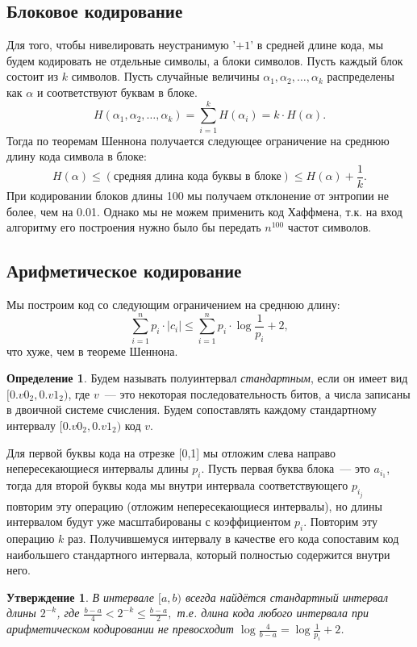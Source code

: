 \documentclass[12pt]{article}
\newcommand{\seqn}[2]{{#1}_1,{#1}_2,\dotsc,{#1}_{#2}}
\theoremstyle{definition}
\newtheorem{definition}{Определение}[section]
\theoremstyle{plain}
\newtheorem{statement}{Утверждение}[section]
\theoremstyle{remark}
\begin{document}
\subsection{Блоковое кодирование}
Для того, чтобы нивелировать неустранимую '$+1$' в средней длине кода, мы будем
кодировать не отдельные символы, а блоки символов.
Пусть каждый блок состоит из $k$ символов. Пусть случайные величины $\seqn{\alpha}{k}$
распределены как $\alpha$ и соответствуют буквам в блоке. 
\[
    H(\seqn{\alpha}{k}) = \sum_{i=1}^k H(\alpha_i) = k\cdot H(\alpha).
\]
Тогда по теоремам Шеннона получается
следующее ограничение на среднюю длину кода символа в блоке:               
\[
    H(\alpha)\le (\text{средняя длина кода буквы в блоке})\le H(\alpha) +
    \frac{1}{k}.
\]
При кодировании блоков длины 100 мы получаем отклонение от энтропии не
более, чем на 0.01. Однако мы не можем применить код Хаффмена, т.к. на
вход алгоритму его построения нужно было бы передать $n^{100}$ частот
символов.

\subsection{Арифметическое кодирование}
Мы построим код со следующим ограничением на среднюю длину:
\[
    \sum_{i=1}^n p_i\cdot|c_i|\le \sum_{i=1}^n p_i\cdot \log\frac1{p_i} + 2, 
\]
что хуже, чем в теореме Шеннона.

\begin{definition}
    Будем называть полуинтервал \emph{стандартным}, если он имеет вид
    $[0.v0_2, 0.v1_2)$, где $v$~--- это некоторая последовательность битов,
    а числа записаны в двоичной системе счисления. Будем сопоставлять каждому
    стандартному интервалу $[0.v0_2, 0.v1_2)$ код $v$.

    Для первой буквы кода на отрезке [0,1] мы отложим слева направо непересекающиеся интервалы длины
    $p_i$. Пусть первая буква блока~--- это $a_{i_1}$, тогда для второй буквы кода мы внутри интервала
    соответствующего $p_{i_j}$ повторим эту операцию (отложим непересекающиеся интервалы), но длины интервалом 
    будут уже масштабированы с коэффициентом
    $p_i$. Повторим эту операцию $k$ раз. Получившемуся интервалу в качестве его кода 
    сопоставим код наибольшего стандартного интервала, который полностью содержится внутри него.
\end{definition}
\begin{statement}
    В интервале $[a,b)$ всегда найдётся стандартный интервал длины $2^{-k}$, где
    \(
    \frac{b-a}{4}<2^{-k}\le \frac{b-a}{2},
    \)
    т.е. длина кода любого интервала при арифметическом кодировании не
    превосходит $\log \frac{4}{b-a} = \log \frac{1}{p_i} + 2$.
\end{statement}
\end{document}
